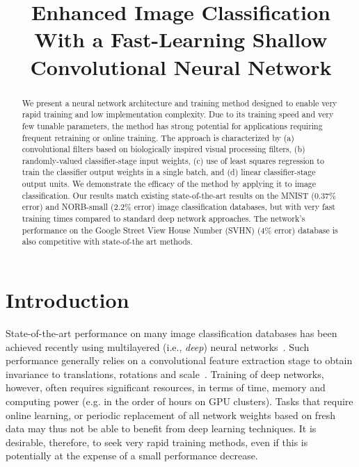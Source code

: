 \documentclass[conference]{IEEEtran}
\begin{document}
\title{Enhanced Image Classification With a Fast-Learning Shallow Convolutional Neural Network}


\author{
}




\maketitle


\begin{abstract}
We present a neural network architecture and training method designed to enable very rapid training and low implementation complexity. Due to its training speed and very few  tunable parameters, the method has strong potential for applications requiring frequent retraining or online training. The approach is characterized by (a) convolutional filters based on biologically inspired visual processing filters, (b) randomly-valued classifier-stage input weights, (c) use of least squares regression to train the classifier output weights in a single batch, and (d) linear classifier-stage output units.  We demonstrate the efficacy of the method by applying it to image classification. Our results match existing state-of-the-art results on the MNIST (0.37\% error) and NORB-small (2.2\% error) image classification databases, but with very fast training times compared to standard deep network approaches. The network's performance on the Google Street View House Number (SVHN) (4\% error) database is  also competitive with state-of-the art methods.

\end{abstract}

\IEEEpeerreviewmaketitle


\section{Introduction}

State-of-the-art performance on many image classification databases has been achieved recently using multilayered (i.e., {\em deep}) neural networks~\cite{Schmidhuber.15}.
Such performance generally relies on a convolutional feature extraction stage to obtain invariance to translations, rotations and scale~\cite{LeCun.98,Coates.11,Coates.11a,Le.10}. Training of deep networks, however, often requires significant resources, in terms of time, memory and computing power (e.g. in the order of hours on GPU clusters). Tasks that require online learning, or periodic replacement of all network weights based on fresh data may thus not be able to benefit from deep learning techniques. It is desirable, therefore, to seek very rapid training methods, even if this is potentially at the expense of a small performance decrease. 
\end{document}
